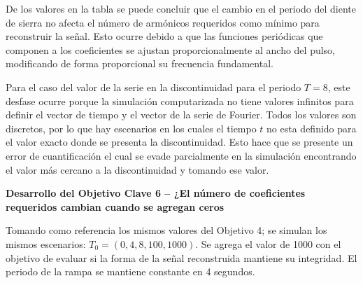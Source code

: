 \documentclass[11pt,a4paper,twocolumn]{article}
\begin{document}
    De los valores en la tabla se puede concluir que el cambio en el periodo del diente de 
    sierra no afecta el número de armónicos requeridos como mínimo para reconstruir la 
    señal. Esto ocurre debido a que las funciones periódicas que componen a los coeficientes 
    se ajustan proporcionalmente al ancho del pulso, modificando de forma proporcional su 
    frecuencia fundamental.
    
    Para el caso del valor de la serie en la discontinuidad para el periodo $T=8$, este desfase 
    ocurre porque la simulación computarizada no tiene valores infinitos para definir el vector 
    de tiempo y el vector de la serie de Fourier. Todos los valores son discretos, por lo que hay 
    escenarios en los cuales el tiempo $t$ no esta definido para el valor exacto donde se 
    presenta la discontinuidad. Esto hace que se presente un error de cuantificación el cual se 
    evade parcialmente en la simulación encontrando el valor más cercano a la discontinuidad 
    y tomando ese valor.
    
    \textbf{Desarrollo del Objetivo Clave 6 -- ¿El número de coeficientes requeridos cambian cuando se agregan ceros}
    
    Tomando como referencia los mismos valores del Objetivo 4; se simulan los mismos 
    escenarios: $T_0=(0,4,8,100,1000)$. Se agrega el valor de 1000 con el objetivo de evaluar si la 
    forma de la señal reconstruida mantiene su integridad. El periodo de la rampa se mantiene 
    constante en 4 segundos.

\end{document}

